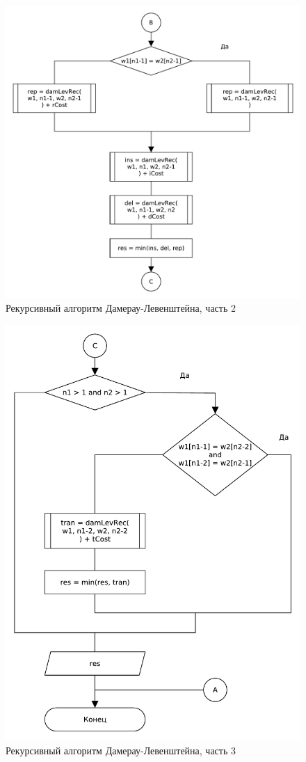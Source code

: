 \begin{figure}[H]
    \centering
    \includegraphics[scale=0.8]{pdf/damerau-levenshteainrec-part2.pdf}
    \caption{Рекурсивный алгоритм Дамерау-Левенштейна, часть 2}
\end{figure}
\begin{figure}[H]
    \centering
    \includegraphics[scale=0.8]{pdf/damerau-levenshteainrec-part3.pdf}
    \caption{Рекурсивный алгоритм Дамерау-Левенштейна, часть 3}
\end{figure}

